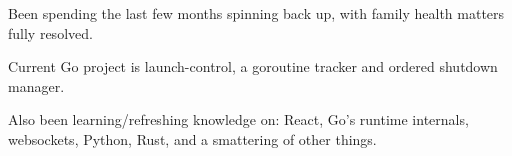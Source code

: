 \item Been spending the last few months spinning back up, with family health matters fully resolved.
\item Current Go project is launch-control, a goroutine tracker and ordered shutdown manager.
\item Also been learning/refreshing knowledge on: React, Go's runtime internals, websockets,
      Python, Rust, and a smattering of other things.


